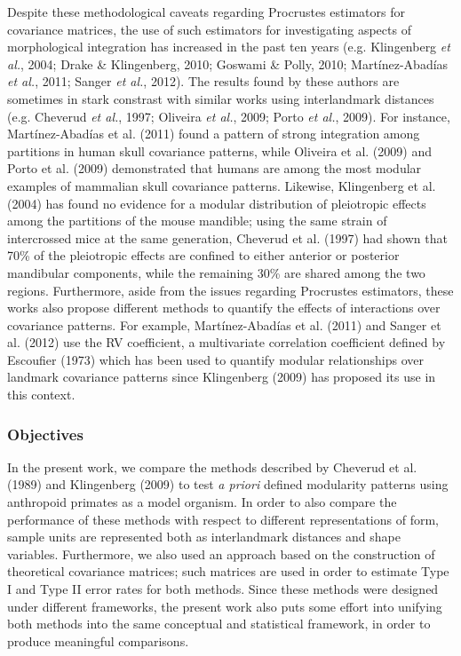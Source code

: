 \documentclass[12pt,twoside]{report}
\begin{document}
Despite these methodological caveats regarding Procrustes estimators for
covariance matrices, the use of such estimators for investigating
aspects of morphological integration has increased in the past ten years
(e.g. Klingenberg \emph{et al.}, 2004; Drake \& Klingenberg, 2010;
Goswami \& Polly, 2010; Martínez-Abadías \emph{et al.}, 2011; Sanger
\emph{et al.}, 2012). The results found by these authors are sometimes
in stark constrast with similar works using interlandmark distances
(e.g. Cheverud \emph{et al.}, 1997; Oliveira \emph{et al.}, 2009; Porto
\emph{et al.}, 2009). For instance, Martínez-Abadías et al. (2011) found
a pattern of strong integration among partitions in human skull
covariance patterns, while Oliveira et al. (2009) and Porto et al.
(2009) demonstrated that humans are among the most modular examples of
mammalian skull covariance patterns. Likewise, Klingenberg et al. (2004)
has found no evidence for a modular distribution of pleiotropic effects
among the partitions of the mouse mandible; using the same strain of
intercrossed mice at the same generation, Cheverud et al. (1997) had
shown that 70\% of the pleiotropic effects are confined to either
anterior or posterior mandibular components, while the remaining 30\%
are shared among the two regions. Furthermore, aside from the issues
regarding Procrustes estimators, these works also propose different
methods to quantify the effects of interactions over covariance
patterns. For example, Martínez-Abadías et al. (2011) and Sanger et al.
(2012) use the RV coefficient, a multivariate correlation coefficient
defined by Escoufier (1973) which has been used to quantify modular
relationships over landmark covariance patterns since Klingenberg (2009)
has proposed its use in this context.

\subsubsection{Objectives}\label{objectives}

In the present work, we compare the methods described by Cheverud et al.
(1989) and Klingenberg (2009) to test \emph{a priori} defined modularity
patterns using anthropoid primates as a model organism. In order to also
compare the performance of these methods with respect to different
representations of form, sample units are represented both as
interlandmark distances and shape variables. Furthermore, we also used
an approach based on the construction of theoretical covariance
matrices; such matrices are used in order to estimate Type I and Type II
error rates for both methods. Since these methods were designed under
different frameworks, the present work also puts some effort into
unifying both methods into the same conceptual and statistical
framework, in order to produce meaningful comparisons.
\end{document}
